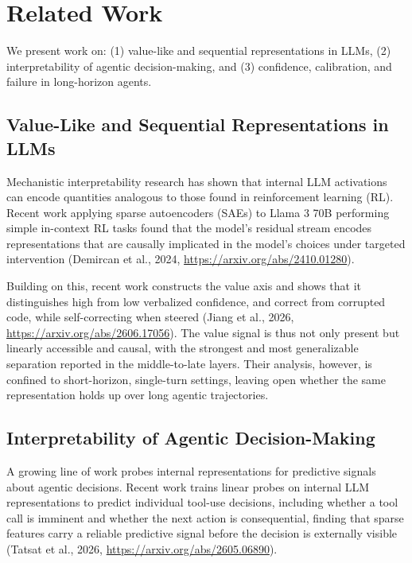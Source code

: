 \documentclass{article}
\begin{document}
\section{Related Work}

We present work on: (1) value-like and sequential representations in LLMs, (2) interpretability of agentic decision-making, and (3) confidence, calibration, and failure in long-horizon agents.

\subsection{Value-Like and Sequential Representations in LLMs}

Mechanistic interpretability research has shown that internal LLM activations can encode quantities analogous to those found in reinforcement learning (RL). Recent work applying sparse autoencoders (SAEs) to Llama 3 70B performing simple in-context RL tasks found that the model's residual stream encodes representations that are causally implicated in the model's choices under targeted intervention (Demircan et al., 2024, \url{https://arxiv.org/abs/2410.01280}).

Building on this, recent work constructs the value axis and shows that it distinguishes high from low verbalized confidence, and correct from corrupted code, while self-correcting when steered (Jiang et al., 2026, \url{https://arxiv.org/abs/2606.17056}). The value signal is thus not only present but linearly accessible and causal, with the strongest and most generalizable separation reported in the middle-to-late layers. Their analysis, however, is confined to short-horizon, single-turn settings, leaving open whether the same representation holds up over long agentic trajectories.

\subsection{Interpretability of Agentic Decision-Making}

A growing line of work probes internal representations for predictive signals about agentic decisions. Recent work trains linear probes on internal LLM representations to predict individual tool-use decisions, including whether a tool call is imminent and whether the next action is consequential, finding that sparse features carry a reliable predictive signal before the decision is externally visible (Tatsat et al., 2026, \url{https://arxiv.org/abs/2605.06890}).
\end{document}
